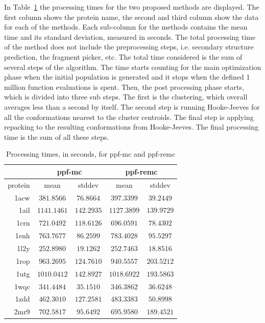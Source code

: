 In Table~\ref{tab:processing-times} the processing times for the two proposed
methods are displayed. The first column shows the protein name, the second and
third column show the data for each of the methods. Each sub-column for the
methods contains the mean time and its standard deviation, measured in seconds.
The total processing time of the method does not include the preprocessing
steps, i.e. secondary structure prediction, the fragment picker, etc. The total
time considered is the sum of several steps of the algorithm. The time starts
counting for the main optimization phase when the initial population is
generated and it stops when the defined 1 million function evaluations is
spent. Then, the post processing phase starts, which is divided into three
sub steps. The first is the clustering, which overall averages less than a
second by itself. The second step is running Hooke-Jeeves for all the
conformations nearest to the cluster centroids. The final step is applying
repacking to the resulting conformations from Hooke-Jeeves. The final
processing time is the sum of all these steps.

\begin{table}
  \centering
  \begin{tabular}{r|c|c||c|c}
            & \multicolumn{2}{c}{ppf-mc} & \multicolumn{2}{||c}{ppf-remc} \\ \hline
    protein & mean & stddev & mean & stddev \\ \hline \hline
    1acw & $ 381.8566$ & $ 76.8664$ & $ 397.3399$ & $ 39.2449$ \\ \hline
    1ail & $1141.1461$ & $142.2935$ & $1127.3899$ & $139.9729$ \\ \hline
    1crn & $ 721.0492$ & $118.6126$ & $ 696.0591$ & $ 78.4302$ \\ \hline
    1enh & $ 763.7677$ & $ 86.2599$ & $ 783.4028$ & $ 95.5297$ \\ \hline
    1l2y & $ 252.8980$ & $ 19.1262$ & $ 252.7463$ & $ 18.8516$ \\ \hline
    1rop & $ 963.2695$ & $124.7610$ & $ 940.5557$ & $203.5212$ \\ \hline
    1utg & $1010.0412$ & $142.8927$ & $1018.6922$ & $193.5863$ \\ \hline
    1wqc & $ 341.4484$ & $ 35.1510$ & $ 346.3862$ & $ 36.6248$ \\ \hline
    1zdd & $ 462.3010$ & $127.2581$ & $ 483.3383$ & $ 50.8998$ \\ \hline
    2mr9 & $ 702.5817$ & $ 95.6492$ & $ 695.9580$ & $189.4521$ \\ \hline
  \end{tabular}
  \caption{Processing times, in seconds, for ppf-mc and ppf-remc}
  \label{tab:processing-times}
\end{table}

